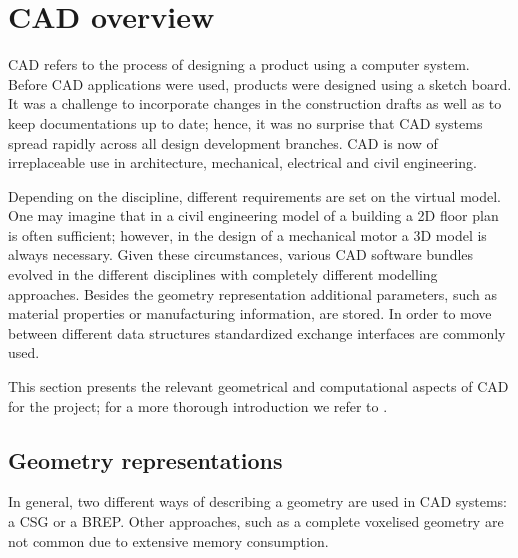 \section{CAD overview}
\label{sec:CADbackg}
\Acf{CAD} refers to the process of designing a product using a computer system. Before \ac{CAD} applications were used, products were designed using a sketch board. It was a challenge to incorporate changes in the construction drafts as well as to keep documentations up to date; hence, it was no surprise that \ac{CAD} systems spread rapidly across all design development branches. \Ac{CAD} is now of irreplaceable use in architecture, mechanical, electrical and civil engineering.

Depending on the discipline, different requirements are set on the virtual model. One may imagine that in a civil engineering model of a building a 2D floor plan is often sufficient; however, in the design of a mechanical motor a 3D model is always necessary. Given these circumstances, various \ac{CAD} software bundles evolved in the different disciplines with completely different modelling approaches. Besides the geometry representation additional parameters, such as material properties or manufacturing information, are stored. In order to move between different data structures standardized exchange interfaces are commonly used. 

This section presents the relevant geometrical and computational aspects of \ac{CAD} for the project; for a more thorough introduction we refer to \cite{sarcarCAD}.

\subsection{Geometry representations}
In general, two different ways of describing a geometry are used in \ac{CAD} systems: a \acf{CSG} or a \acf{BREP}. Other approaches, such as a complete voxelised geometry are not common due to extensive memory consumption.
